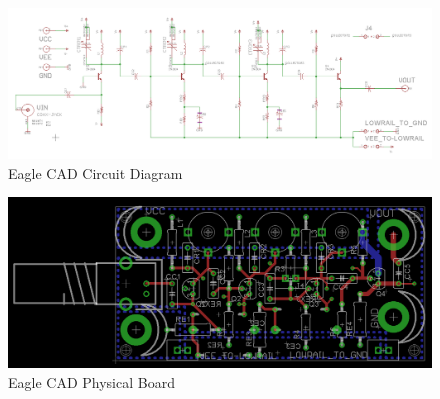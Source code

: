 \documentclass[titlepage, letterpaper, 10.5pt]{article}
\begin{document}
\begin{figure}[ht]
	\centering
	\includegraphics[width=\textwidth]
		{images/multiStageEagleCircuit}
	\caption{Eagle CAD Circuit Diagram}
\end{figure}

\begin{figure}[ht]
	\centering
	\includegraphics[width=\textwidth]
		{images/multiStageEagleBoard}
	\caption{Eagle CAD Physical Board}
\end{figure}
\end{document}

